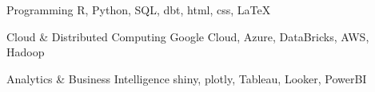 

\begin{cvskills}

  \cvskill
    {Programming} %
    {R, Python, SQL, dbt, html, css, \LaTeX} %

  \cvskill
    {Cloud \& Distributed Computing} %
    {Google Cloud, Azure, DataBricks, AWS, Hadoop} %

\cvskill
{Analytics \& Business Intelligence} %
{shiny, plotly, Tableau, Looker, PowerBI} %



\end{cvskills}
